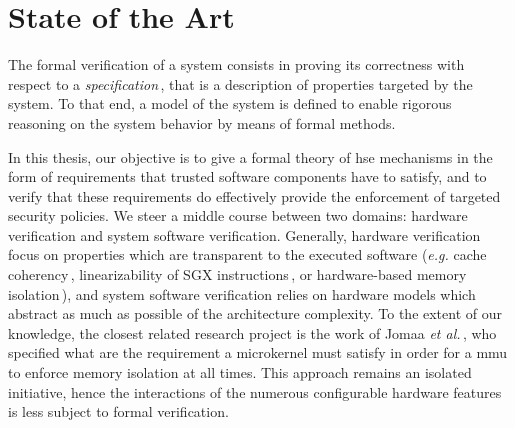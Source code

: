 \chapter{State of the Art}
\label{chapter:relatedwork}


%

\vspace{1cm}%
\noindent
%
The formal verification of a system consists in proving its correctness with
respect to a \emph{specification}\,\cite{gupta1992formal}, that is a description
of properties targeted by the system.
%
To that end, a model of the system is defined to enable rigorous reasoning on
the system behavior by means of formal methods.
%
%

In this thesis, our objective is to give a formal theory of \ac{hse} mechanisms
in the form of requirements that trusted software components have to satisfy,
and to verify that these requirements do effectively provide the enforcement of
targeted security policies.
%
We steer a middle course between two domains: hardware verification and system
software verification.
%
Generally, hardware verification focus on properties which are transparent to
the executed software (\emph{e.g.} cache
coherency\,\cite{stern1995cachecoherence}, linearizability of SGX
instructions\,\cite{leslie2015linsgx}, or hardware-based memory
isolation\,\cite{lie2003xom}), and system software verification relies on
hardware models which abstract as much as possible of the architecture
complexity.
%
To the extent of our knowledge, the closest related research project is the work
of Jomaa \emph{et al.}\,\cite{jomaa2016mmu}, who specified what are the
requirement a microkernel must satisfy in order for a \ac{mmu} to enforce memory
isolation at all times.
%
This approach remains an isolated initiative, hence the interactions of the
numerous configurable hardware features is less subject to formal verification.

